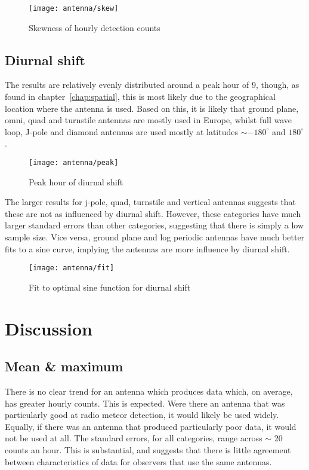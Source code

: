 \begin{figure}[h!]
	\centering
	\texttt{[image: antenna/skew]}
	\caption{Skewness of hourly detection counts
		\label{fig:ant:skew}}
\end{figure}

\subsection{Diurnal shift}
The results are relatively evenly distributed around a peak hour of 9, though, as found in chapter~\ref{chap:spatial}, this is most likely due to the geographical location where the antenna is used. Based on this, it is likely that ground plane, omni, quad and turnstile antennas are mostly used in Europe, whilst full wave loop, J-pole and diamond antennas are used mostly at latitudes $\sim -180^{\circ}$ and $180^{\circ}$.

\begin{figure}[h!]
	\centering
	\texttt{[image: antenna/peak]}
	\caption{Peak hour of diurnal shift
		\label{fig:ant:peak}}
\end{figure}

The larger results for j-pole, quad, turnstile and vertical antennas suggests that these are not as influenced by diurnal shift. However, these categories have much larger standard errors than other categories, suggesting that there is simply a low sample size. Vice versa, ground plane and log periodic antennas have much better fits to a sine curve, implying the antennas are more influence by diurnal shift.
\begin{figure}[h!]
	\centering
	\texttt{[image: antenna/fit]}
	\caption{Fit to optimal sine function for diurnal shift
		\label{fig:ant:fit}}
\end{figure}

\section{Discussion}
\subsection{Mean \& maximum}
There is no clear trend for an antenna which produces data which, on average, has greater hourly counts. This is expected. Were there an antenna that was particularly good at radio meteor detection, it would likely be used widely. Equally, if there was an antenna that produced particularly poor data, it would not be used at all. The standard errors, for all categories, range across $\sim$ 20 counts an hour. This is substantial, and suggests that there is little agreement between characteristics of data for observers that use the same antennas.
